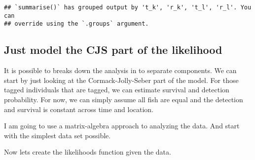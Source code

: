 \documentclass[
]{article}
\newenvironment{Shaded}{\begin{snugshade}}{\end{snugshade}}
\newcommand{\AttributeTok}[1]{\textcolor[rgb]{0.77,0.63,0.00}{#1}}
\newcommand{\CommentTok}[1]{\textcolor[rgb]{0.56,0.35,0.01}{\textit{#1}}}
\newcommand{\DecValTok}[1]{\textcolor[rgb]{0.00,0.00,0.81}{#1}}
\newcommand{\FunctionTok}[1]{\textcolor[rgb]{0.00,0.00,0.00}{#1}}
\newcommand{\NormalTok}[1]{#1}
\newcommand{\OtherTok}[1]{\textcolor[rgb]{0.56,0.35,0.01}{#1}}
\newcommand{\SpecialCharTok}[1]{\textcolor[rgb]{0.00,0.00,0.00}{#1}}
\begin{document}
\begin{verbatim}
## `summarise()` has grouped output by 't_k', 'r_k', 't_l', 'r_l'. You can
## override using the `.groups` argument.
\end{verbatim}

\hypertarget{just-model-the-cjs-part-of-the-likelihood}{%
\subsection{Just model the CJS part of the
likelihood}\label{just-model-the-cjs-part-of-the-likelihood}}

It is possible to breaks down the analysis in to separate components. We
can start by just looking at the Cormack-Jolly-Seber part of the model.
For those tagged individuals that are tagged, we can estimate survival
and detection probability. For now, we can simply assume all fish are
equal and the detection and survival is constant across time and
location.

I am going to use a matrix-algebra approach to analyzing the data. And
start with the simplest data set possible.

\begin{Shaded}
\end{Shaded}

Now lets create the likelihoods function given the data.
\end{document}
